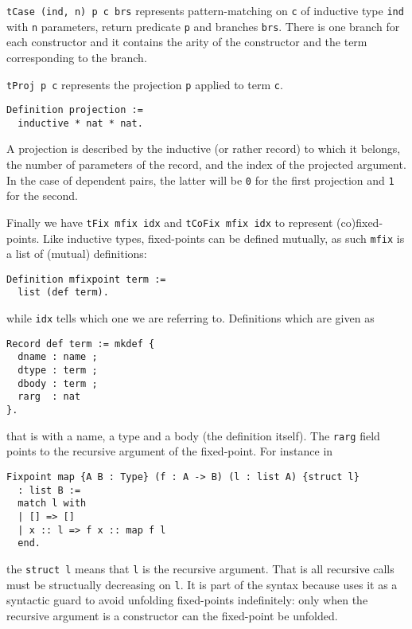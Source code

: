 \texttt{tCase (ind, n) p c brs} represents pattern-matching on
\texttt{c} of inductive type \texttt{ind} with
\texttt{n} parameters, return predicate \texttt{p}
and branches \texttt{brs}.
There is one branch for each constructor and it contains the arity of the
constructor and the term corresponding to the branch.

\texttt{tProj p c} represents the projection \texttt{p}
applied to term \texttt{c}.
\begin{verbatim}
Definition projection :=
  inductive * nat * nat.
\end{verbatim}
A projection is described by the inductive (or rather record) to which it
belongs, the number of parameters of the record, and the index of the projected
argument. In the case of dependent pairs, the latter will be \texttt{0}
for the first projection and \texttt{1} for the second.

Finally we have \texttt{tFix mfix idx} and
\texttt{tCoFix mfix idx} to represent (co)fixed-points.
Like inductive types, fixed-points can be defined mutually, as such
\texttt{mfix} is a list of (mutual) definitions:
\begin{verbatim}
Definition mfixpoint term :=
  list (def term).
\end{verbatim}
while \texttt{idx} tells which one we are referring to.
Definitions which are given as
\begin{verbatim}
Record def term := mkdef {
  dname : name ;
  dtype : term ;
  dbody : term ;
  rarg  : nat
}.
\end{verbatim}
that is with a name, a type and a body (the definition itself).
The \texttt{rarg} field points to the recursive argument of the
fixed-point.
For instance in
\begin{verbatim}
Fixpoint map {A B : Type} (f : A -> B) (l : list A) {struct l}
  : list B :=
  match l with
  | [] => []
  | x :: l => f x :: map f l
  end.
\end{verbatim}
the \texttt{{struct l}} means that \texttt{l} is the recursive
argument. That is all recursive calls must be structually decreasing on
\texttt{l}. It is part of the syntax because \Coq uses it as a
syntactic guard to avoid unfolding fixed-points indefinitely: only when the
recursive argument is a constructor can the fixed-point be unfolded.

